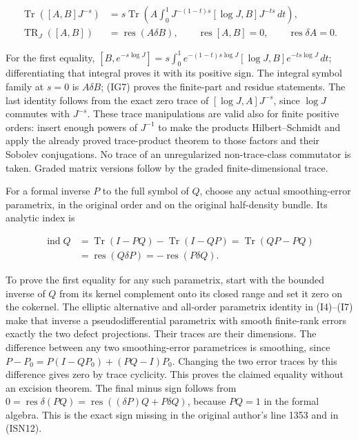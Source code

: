 \documentclass[
  11pt,
]{article}
\begin{document}
\[
 \begin{split}
 \operatorname{Tr}([A,B]J^{-s})
 &=s\operatorname{Tr}\!\left(
 A\int_0^1J^{-(1-t)s}[\log J,B]J^{-ts}\,dt\right),\\
 \operatorname{TR}_J([A,B])&=\operatorname{res}(A\delta B),\qquad
 \operatorname{res}[A,B]=0,
 \qquad \operatorname{res}\delta A=0.
 \end{split}
\tag{IG9}
\]

For the first equality,
\([B,e^{-s\log J}]=s\int_0^1e^{-(1-t)s\log J}[\log J,B]e^{-ts\log J}\,dt\);
differentiating that integral proves it with its positive sign. The
integral symbol family at \(s=0\) is \(A\delta B\); (IG7) proves the
finite-part and residue statements. The last identity follows from the
exact zero trace of \([\log J,A]J^{-s}\), since \(\log J\) commutes with
\(J^{-s}\). These trace manipulations are valid also for finite positive
orders: insert enough powers of \(J^{-1}\) to make the products
Hilbert--Schmidt and apply the already proved trace-product theorem to
those factors and their Sobolev conjugations. No trace of an
unregularized non-trace-class commutator is taken. Graded matrix
versions follow by the graded finite-dimensional trace.

For a formal inverse \(P\) to the full symbol of \(Q\), choose any
actual smoothing-error parametrix, in the original order and on the
original half-density bundle. Its analytic index is

\[
 \begin{split}
 \operatorname{ind}Q
 &=\operatorname{Tr}(I-PQ)-\operatorname{Tr}(I-QP)
   =\operatorname{Tr}(QP-PQ)\\
 &=\operatorname{res}(Q\delta P)
   =-\operatorname{res}(P\delta Q).
 \end{split}
\tag{IG10}
\]

To prove the first equality for any such parametrix, start with the
bounded inverse of \(Q\) from its kernel complement onto its closed
range and set it zero on the cokernel. The elliptic alternative and
all-order parametrix identity in (I4)--(I7) make that inverse a
pseudodifferential parametrix with smooth finite-rank errors exactly the
two defect projections. Their traces are their dimensions. The
difference between any two smoothing-error parametrices is smoothing,
since \(P-P_0=P(I-QP_0)+(PQ-I)P_0\). Changing the two error traces by
this difference gives zero by trace cyclicity. This proves the claimed
equality without an excision theorem. The final minus sign follows from
\(0=\operatorname{res}\delta(PQ)=\operatorname{res}((\delta P)Q+P\delta Q)\),
because \(PQ=1\) in the formal algebra. This is the exact sign missing
in the original author's line 1353 and in (ISN12).
\end{document}
